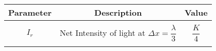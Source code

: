 \begin{tabular}{|c|c|c|}
\hline 
   \textbf{Parameter}  &\textbf{Description} &\textbf{Value} \\
\hline
&&\\
$I_r$&Net Intensity of light at $\Delta x =\dfrac{\lambda}{3}$ &$\dfrac{K}{4}$ \\&&\\
\hline
\end{tabular}
